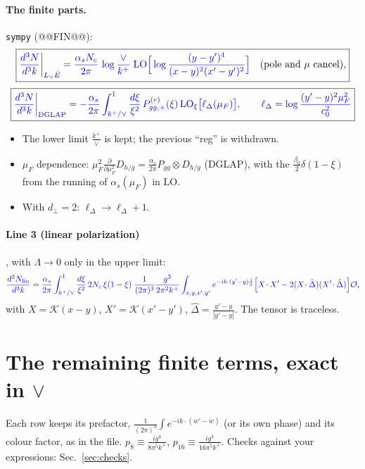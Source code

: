 \documentclass[10pt]{article}
\numberwithin{equation}{section}
\newcommand{\new}[1]{{\color{blue}#1}}
\newcommand{\Lv}{L_{\vee}}
\newcommand{\OO}{\mathcal O}
\newcommand{\KK}{\mathcal K}
\newcommand{\Dh}{\hat\Delta}
\newcommand{\Eh}{\hat E}
\newcommand{\LOx}[1]{{\rm LO}_\xi\big[#1\big]}
\newcommand{\pre}{\frac{1}{(2\pi)^3}}
\newcommand{\phw}{e^{-ik\cdot(w'-w)}}
\begin{document}
\paragraph{The finite parts.} \texttt{sympy} (@@FIN@@):
\begin{equation}
\boxed{\new{\frac{d^3N}{d^3k}\bigg|_{\Lv\Eh}=\frac{\alpha_sN_c}{2\pi}\,\log\frac{\vee}{k^+}\;{\rm LO}\Big[\log\frac{(y-y')^4}{(x-y)^2(x'-y')^2}\Big]}\quad(\text{pole and }\mu\text{ cancel}),}
\label{eq:LvE}
\end{equation}
\begin{equation}
\boxed{\new{\frac{d^3N}{d^3k}\bigg|_{\rm DGLAP}=-\frac{\alpha_s}{2\pi}\int_{k^+/\vee}^1\frac{d\xi}{\xi^2}\,P^{(r)}_{gg,+}(\xi)\,\LOx{\ell_\Delta(\mu_F)},\qquad\ell_\Delta=\log\frac{(y'-y)^2\mu_F^2}{c_0^2}}}
\label{eq:dglap}
\end{equation}
\begin{itemize}
\item The lower limit $\frac{k^+}{\vee}$ is kept; the previous ``reg'' is withdrawn.
\item $\mu_F$ dependence: $\mu_F^2\frac{\partial}{\partial\mu_F^2}D_{h/g}=\frac{\alpha_s}{2\pi}P_{gg}\otimes D_{h/g}$ (DGLAP), with the $\frac{\beta_0}{2}\delta(1-\xi)$ from the running of $\alpha_s(\mu_F)$ in LO.
\item With $d_\perp=2$: $\ell_\Delta\to\ell_\Delta+1$.
\end{itemize}

\paragraph{Line 3 (linear polarization)}, with $\Lambda\to0$ only in the upper limit:
\begin{equation}
\new{\frac{d^3N_{\rm lin}}{d^3k}=\frac{\alpha_s}{2\pi}\int_{k^+/\vee}^1\frac{d\xi}{\xi^2}\,2N_c\,\xi(1-\xi)\;\pre\frac{g^2}{2\pi^2k^+}\int_{x,y,x',y'}e^{-ik\cdot(y'-y)\frac1\xi}\Big[X\!\cdot X'-2(X\!\cdot\Dh)(X'\!\cdot\Dh)\Big]\OO},
\label{eq:lin}
\end{equation}
with $X=\KK(x-y)$, $X'=\KK(x'-y')$, $\Dh=\frac{y'-y}{|y'-y|}$. The tensor is traceless.

\section{The remaining finite terms, exact in \texorpdfstring{$\vee$}{vee}}\label{sec:simp}
Each row keeps its prefactor, $\pre\int\phw$ (or its own phase) and its colour factor, as in the file. $p_8\equiv\frac{ig^4}{8\pi^5k^+}$, $p_{16}\equiv\frac{ig^4}{16\pi^5k^+}$. Checks against your expressions: Sec.~\ref{sec:checks}.
\end{document}
